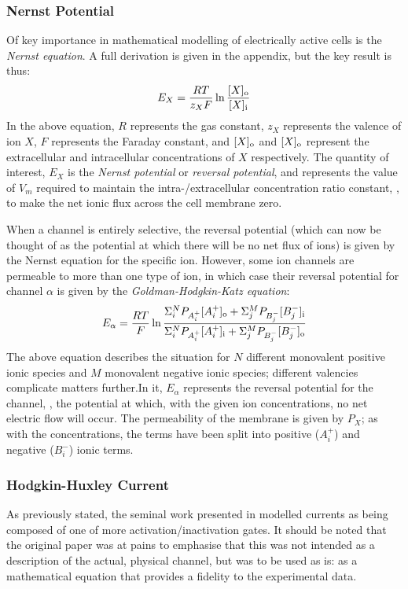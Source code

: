 \documentclass[../thesis-main.tex]{subfiles}
\begin{document}
 \subsubsection{Nernst Potential}
 \label{subsubsec:nernst}
 Of key importance in mathematical modelling of electrically active cells is the \emph{Nernst equation}. A full derivation is given in the appendix, but the key result is thus:
 \begin{equation}
  E_X = \frac{RT}{z_XF}\ln\frac{[X]_\textnormal{o}}{[X]_\textnormal{i}}
 \end{equation}
 In the above equation, $R$ represents the gas constant, $z_X$ represents the valence of ion $X$, $F$ represents the Faraday constant, and $[X]_\textnormal{o}$ and $[X]_\textnormal{o}$ represent the extracellular and intracellular concentrations of $X$ respectively. The quantity of interest, $E_X$ is the \emph{Nernst potential} or \emph{reversal potential}, and represents the value of $V_m$ required to maintain the intra-/extracellular concentration ratio constant, \idest, to make the net ionic flux across the cell membrane zero.
 
 When a channel is entirely selective, the reversal potential (which can now be thought of as the potential at which there will be no net flux of ions) is given by the Nernst equation for the specific ion. However, some ion channels are permeable to more than one type of ion, in which case their reversal potential for channel $\alpha$ is given by the \emph{Goldman-Hodgkin-Katz equation}:
 \begin{equation}
  E_\alpha = \frac{RT}{F}\ln\frac{\Sigma_i^N P_{A_i^+}[A_i^+]_\textnormal{o} + \Sigma_j^M P_{B_j^-}[B_j^-]_\textnormal{i}}{\Sigma_i^N P_{A_i^+}[A_i^+]_\textnormal{i} + \Sigma_j^M P_{B_j^-}[B_j^-]_\textnormal{o}}
 \end{equation}
 The above equation describes the situation for $N$ different monovalent positive ionic species and $M$ monovalent negative ionic species; different valencies complicate matters further.In it, $E_\alpha$ represents the reversal potential for the channel, \idest, the potential at which, with the given ion concentrations, no net electric flow will occur. The permeability of the membrane is given by $P_X$; as with the concentrations, the terms have been split into positive ($A_i^+$) and negative ($B_i^-$) ionic terms.
 
 \subsubsection{Hodgkin-Huxley Current}
 As previously stated, the seminal work presented in \citet{Hodgkin1952} modelled currents as being composed of one of more activation/inactivation gates. It should be noted that the original paper was at pains to emphasise that this was not intended as a description of the actual, physical channel, but was to be used as is: as a mathematical equation that provides a fidelity to the experimental data.
 
\end{document}
